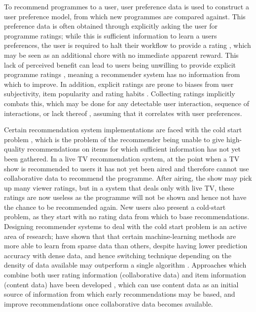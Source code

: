 	To recommend programmes to a user, user preference data is used to construct a user preference model, from which new programmes are compared against. This preference data is often obtained through explicitly asking the user for programme ratings; while this is sufficient information to learn a users preferences, the user is required to halt their workflow to provide a rating \citep{implicit_indicators}, which may be seen as an additional chore with no immediate apparent reward. This lack of perceived benefit can lead to users being unwilling to provide explicit programme ratings \citep{8_challenges}, meaning a recommender system has no information from which to improve. In addition, explicit ratings are prone to biases from user subjectivity, item popularity and rating habits \citep[p.~304]{recommender-systems-handbook}. Collecting ratings implicitly combats this, which may be done for any detectable user interaction, sequence of interactions, or lack thereof \citep{implicit_indicators}, assuming that it correlates with user preferences.

	Certain recommendation system implementations are faced with the cold start problem \cite{cold-start-problem}, which is the problem of the recommender being unable to give high-quality recommendations on items for which sufficient information has not yet been gathered. In a live TV recommendation system, at the point when a TV show is recommended to users it has not yet been aired and therefore cannot use collaborative data to recommend the programme. After airing, the show may pick up many viewer ratings, but in a system that deals only with live TV, these ratings are now useless as the programme will not be shown and hence not have the chance to be recommended again. New users also present a cold-start problem, as they start with no rating data from which to base recommendations. Designing recommender systems to deal with the cold start problem is an active area of research; \citep{cold-start-problem} have shown that that certain machine-learning methods are more able to learn from sparse data than others, despite having lower prediction accuracy with dense data, and hence switching technique depending on the density of data available may outperform a single algorithm . Approaches which combine both user rating information (collaborative data) and item information (content data) have been developed \citep{generative_models}, which can use content data as an initial source of information from which early recommendations may be based, and improve recommendations once collaborative data becomes available.

